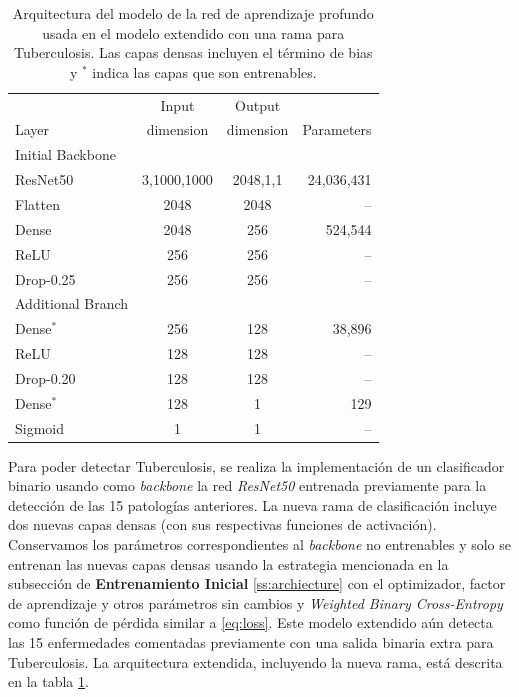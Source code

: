 \begin{table}[!ht]
    \centering
    \begin{tabular}{| l| c | c | r |}
     \hline
                 &  Input       & Output           &   \\
    Layer        &  dimension    & dimension        & Parameters \\
    \hline\hline
    Initial Backbone & & & \\ \hline
    ResNet50     &  3,1000,1000 &     2048,1,1     & 24,036,431 \\
    Flatten      &     2048     &     2048         &  --        \\
    Dense        &     2048     &     256          & 524,544    \\
    ReLU         &     256      &     256          & --         \\
    Drop-0.25    &     256      &     256          & --         \\
    \hline
    Additional Branch & & & \\ \hline
    Dense$^\ast$ &     256      &     128          &  38,896     \\
    ReLU         &     128      &     128          & --         \\
    Drop-0.20    &     128      &     128          & --         \\
    Dense$^\ast$ &     128      &      1           &  129       \\
    Sigmoid      &      1       &      1           & --         \\
     \hline
    \end{tabular}
    \caption{ Arquitectura del modelo de la red de aprendizaje profundo usada en el modelo extendido
             con una rama para Tuberculosis. Las capas densas incluyen el término de bias y $^\ast$
             indica las capas que son entrenables.}
\label{table_resnet50_tb}
\end{table}

Para poder detectar Tuberculosis, se realiza la implementación de un clasificador binario usando como
\textit{backbone} la red \textit{ResNet50} entrenada previamente para la detección de las 15 patologías
anteriores. La nueva rama de clasificación incluye dos nuevas capas densas (con sus respectivas funciones
de activación). Conservamos los parámetros correspondientes al \textit{backbone} no entrenables y solo se
entrenan las nuevas capas densas usando la estrategia mencionada en la subsección de {\bf Entrenamiento
Inicial} \ref{ss:archiecture} con el optimizador, factor de aprendizaje y otros parámetros sin cambios y
\textit{Weighted Binary Cross-Entropy} como función de pérdida similar a \eqref{eq:loss}. Este modelo
extendido aún detecta las 15 enfermedades comentadas previamente con una salida binaria extra para
Tuberculosis. La arquitectura extendida, incluyendo la nueva rama, está descrita en la tabla
\ref{table_resnet50_tb}.


